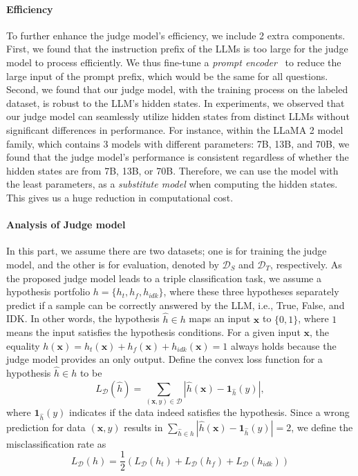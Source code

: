 \paragraph{Efficiency}
To further enhance the judge model's efficiency, we include 2 extra components. First, we found that the instruction prefix of the LLMs is too large for the judge model to process efficiently. We thus fine-tune a {\it prompt encoder}~\cite{liu-etal-2022-p} to reduce the large input of the prompt prefix, which would be the same for all questions. 
Second, we found that our judge model, with the training process on the labeled dataset, is robust to the LLM's hidden states. %
In experiments, we observed that our judge model can seamlessly utilize hidden states from distinct LLMs without significant differences in performance. For instance, within the LLaMA 2 model family, which contains 3 models with different parameters: 7B, 13B, and 70B, we found that the judge model's performance is consistent regardless of whether the hidden states are from 7B, 13B, or 70B. %
Therefore, we can use the model with the least parameters, as a {\it substitute model} when computing the hidden states. This gives us a huge reduction in computational cost.






\paragraph{Analysis of Judge model}
In this part, we assume there are two datasets; one is for training the judge model, and the other is for evaluation, denoted by $\mathcal{D}_S$ and $\mathcal{D}_T$, respectively. As the proposed judge model leads to a triple classification task, we assume a hypothesis portfolio $h = \{h_t, h_f, h_{idk}\}$, where these three hypotheses separately predict if a sample can be correctly answered by the LLM, i.e., True, False, and IDK. In other words, the hypothesis $\hat{h} \in h$ maps an input $\mathbf{x}$ to $\{0, 1\}$, where $1$ means the input satisfies the hypothesis conditions. For a given input $\mathbf{x}$, the equality 
$h(\mathbf{x}) = h_t(\mathbf{x}) + h_f(\mathbf{x}) + h_{idk}(\mathbf{x}) = 1$
always holds because the judge model provides an only output. Define the convex loss function for a hypothesis $\hat{h} \in h$ to be $$L_{\mathcal{D}}(\hat{h}) = \sum_{(\mathbf{x}, y) \in \mathcal{D}} |\hat{h}(\mathbf{x}) - \boldsymbol{1}_{\hat{h}}(y)|,$$ where $\boldsymbol{1}_{\hat{h}}(y)$ indicates if the data indeed satisfies the hypothesis. Since a wrong prediction for data $(\mathbf{x}, y)$ results in $\sum_{\hat{h} \in h} |\hat{h}(\mathbf{x}) - \boldsymbol{1}_{\hat{h}}(y)| = 2$, we define the misclassification rate as 
$$L_{\mathcal{D}} \left(h\right) = \frac{1}{2} \left(L_{\mathcal{D}} \left(h_t\right) + L_{\mathcal{D}} \left(h_f\right) + L_{\mathcal{D}} \left(h_{idk}\right)\right) $$ 

